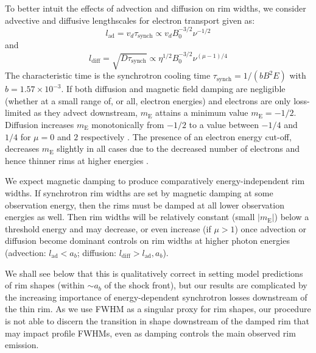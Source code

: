 \documentclass[manuscript]{aastex}  %
\newcommand*{\mt}{\mathrm}
\newcommand*{\abt}{\mathord{\sim}} %
\newcommand*{\tsynch}{\tau_{\mt{synch}}}
\newcommand*{\mE}{m_\mt{E}}
\begin{document}
To better intuit the effects of advection and diffusion on rim widths, we
consider advective and diffusive lengthscales for electron transport given as:
\begin{equation} \label{eq:lad}
    l_{\mt{ad}} = v_d \tsynch \propto v_d B_0^{-3/2} \nu^{-1/2}
\end{equation}
and
\begin{equation} \label{eq:ldiff}
    l_{\mt{diff}} = \sqrt{D \tsynch} \propto \eta^{1/2} B_0^{-3/2} \nu^{(\mu-1)/4}
\end{equation}
The characteristic time is the synchrotron cooling time
$\tsynch = 1 / (b B^2 E)$ with $b = 1.57 \times 10^{-3}$.
If both diffusion and magnetic field damping are negligible (whether at a small
range of, or all, electron energies) and electrons are only loss-limited as
they advect downstream, $\mE$ attains a minimum value $\mE = -1/2$.  Diffusion
increases $\mE$ monotonically from $-1/2$ to a value between $-1/4$ and $1/4$
for $\mu = 0$ and $2$ respectively .  The
presence of an electron energy cut-off, decreases $\mE$ slightly in all cases
due to the decreased number of electrons and hence thinner rims at higher
energies .

We expect magnetic damping to produce comparatively energy-independent rim
widths.  If synchrotron rim widths are set by magnetic damping
at some observation energy, then the rims must be damped at all lower
observation energies as well.  Then rim widths will be relatively constant
(small $|\mE|$) below a threshold energy and may decrease, or even increase
(if $\mu > 1$) once advection or diffusion become dominant controls on rim
widths at higher photon energies (advection: $l_\mt{ad} < a_b$;
diffusion: $l_{\mt{diff}} > l_{\mt{ad}}, a_b$).

We shall see below that this is qualitatively correct in setting model
predictions of rim shapes (within $\abt a_b$ of the shock front), but our
results are complicated by the increasing importance of energy-dependent
synchrotron losses downstream of the thin rim.  As we use FWHM as a singular
proxy for rim shapes, our procedure is not able to discern the transition in
shape downstream of the damped rim that may impact profile FWHMs, even as
damping controls the main observed rim emission.

\end{document}
